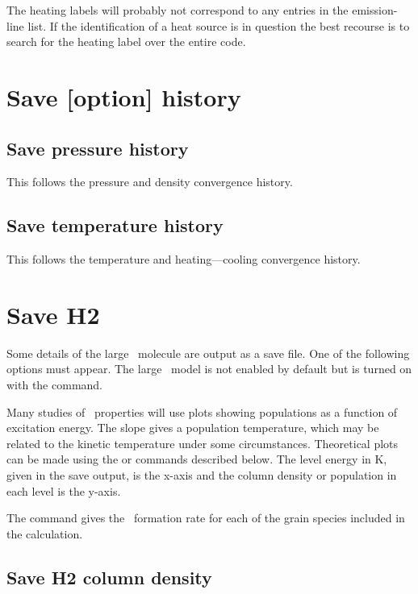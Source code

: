 The heating labels will probably not correspond to any entries in the
emission-line list.  If the identification of a heat source is in question
the best recourse is to search for the heating label over the entire code.

\section{Save [option] history}

\subsection{Save pressure history}

This follows the pressure and density convergence history.

\subsection{Save temperature history}

This follows the temperature and heating---cooling convergence history.

\section{Save H2}

Some details of the large \htwo\ molecule are output as a save file.  One
of the following options must appear.  The large \htwo\ model is not enabled
by default but is turned on with the  command.

Many studies of \htwo\ properties will use plots showing populations as a
function of excitation energy.  The slope gives a population temperature,
which may be related to the kinetic temperature under some circumstances.
Theoretical plots can be made using the
or  commands described below.
The level energy in K, given in
the save output, is the x-axis and the column density or population in
each level is the y-axis.

The  command gives
the \htwo\ formation rate for each of the grain species included in the calculation.

\subsection{Save H2 column density}

